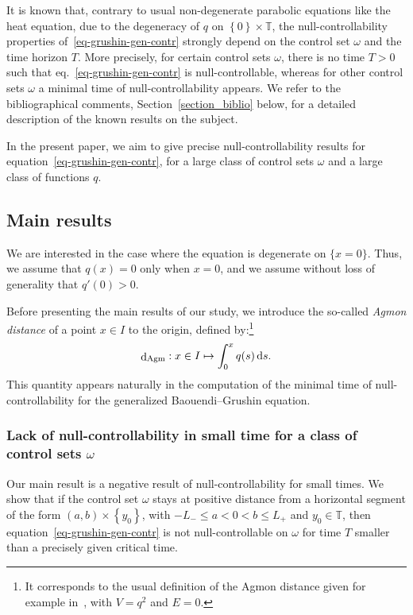 \documentclass[10pt]{amsart}
\theoremstyle{definition}\newtheorem{defi}[theo]{Definition}\newtheorem{rema}[theo]{Remark}\newtheorem{exam}[theo]{Example}\newtheorem{exem}[theo]{Example}\newtheorem{nota}[theo]{Notation}
\renewcommand{\leq}{\leqslant}
\newcommand{\1}{\mathds 1}
\newcommand{\dagmon}{\mathop{\mathrm{d}}\nolimits_{\mathrm{Agm}}}
\newcommand{\T}{\mathbb{T}}
\newcommand{\diff}[1][-3]{\ensuremath{\mathop{}\mkern#1mu\mathrm{d}}}
\renewcommand{\o}{\omega}
\begin{document}
It is known that, contrary to usual non-degenerate parabolic equations like the heat equation, due to the degeneracy of $q$ on $\left\lbrace 0 \right\rbrace \times \T$, the null-controllability properties of~\eqref{eq-grushin-gen-contr} strongly depend on the control set $\o$ and the time horizon $T$. More precisely, for certain control sets $\o$, there is no time $T>0$ such that eq.~\eqref{eq-grushin-gen-contr} is null-controllable, whereas for other control sets $\o$ a minimal time of null-controllability appears. We refer to the bibliographical comments, Section~\ref{section_biblio} below, for a detailed description of the known results on the subject.

In the present paper, we aim to give precise null-controllability results for equation~\eqref{eq-grushin-gen-contr}, for a large class of control sets $\o$ and a large class of functions $q$.

\subsection{Main results}

We are interested in the case where the equation is degenerate on $\{x=0\}$. Thus, we assume that $q(x) = 0$ only when $x=0$, and we assume without loss of generality that $q'(0) > 0$.

Before presenting the main results of our study, we introduce the so-called \emph{Agmon distance} of a point $x \in I$ to the origin, defined by:\footnote{It corresponds to the usual definition of the Agmon distance given for example in~\cite[Eq.~(6.3)]{DS99}, with $V = q^2$ and $E = 0$.}
\begin{equation}\label{eq-def-agmon}
\dagmon : x\in I \mapsto \int_0^x q(s)\diff s.
\end{equation}
This quantity appears naturally in the computation of the minimal time of null-controllability for the generalized Baouendi--Grushin equation.

\subsubsection{Lack of null-controllability in small time for a class of control sets $\o$}

Our main result is a negative result of null-controllability for small times. We show that if the control set $\o$ stays at positive distance from a horizontal segment of the form $(a,b)\times \left\lbrace y_0 \right\rbrace$, with $-L_-\leq a<0<b\leq L_+$ and $y_0 \in \T$, then equation~\eqref{eq-grushin-gen-contr} is not null-controllable on $\o$ for time $T$ smaller than a precisely given critical time.
\end{document}
